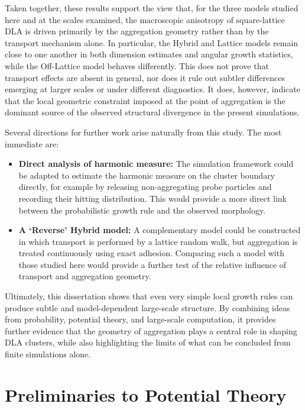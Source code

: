 \documentclass[12pt, a4paper, oneside]{report}
\theoremstyle{remark}
\begin{document}
Taken together, these results support the view that, for the three models studied here and at the scales examined, the macroscopic anisotropy of square-lattice DLA is driven primarily by the aggregation geometry rather than by the transport mechanism alone. In particular, the Hybrid and Lattice models remain close to one another in both dimension estimates and angular growth statistics, while the Off-Lattice model behaves differently. This does not prove that transport effects are absent in general, nor does it rule out subtler differences emerging at larger scales or under different diagnostics. It does, however, indicate that the local geometric constraint imposed at the point of aggregation is the dominant source of the observed structural divergence in the present simulations.

Several directions for further work arise naturally from this study. The most immediate are:
\begin{itemize}
    \item \textbf{Direct analysis of harmonic measure:} The simulation framework could be adapted to estimate the harmonic measure on the cluster boundary directly, for example by releasing non-aggregating probe particles and recording their hitting distribution. This would provide a more direct link between the probabilistic growth rule and the observed morphology.
    \item \textbf{A `Reverse' Hybrid model:} A complementary model could be constructed in which transport is performed by a lattice random walk, but aggregation is treated continuously using exact adhesion. Comparing such a model with those studied here would provide a further test of the relative influence of transport and aggregation geometry.
\end{itemize}

Ultimately, this dissertation shows that even very simple local growth rules can produce subtle and model-dependent large-scale structure. By combining ideas from probability, potential theory, and large-scale computation, it provides further evidence that the geometry of aggregation plays a central role in shaping DLA clusters, while also highlighting the limits of what can be concluded from finite simulations alone.



\appendix

\chapter{Preliminaries to Potential Theory}
\label{app:preliminaries}
\end{document}
